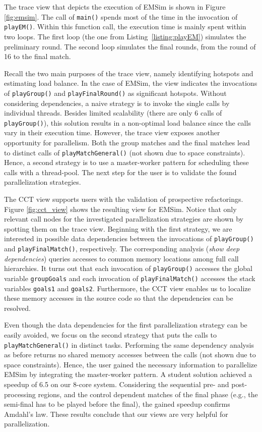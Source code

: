 The trace view that depicts the execution of EMSim is shown in Figure
\ref{fig:emsim}. The call of \texttt{main()} spends most of the time in the
invocation of \texttt{playEM()}. Within this function call, the execution time
is mainly spent within two loops. The first loop (the one from
Listing~\ref{listing:playEM}) simulates the preliminary round. The second loop
simulates the final rounds, from the round of 16 to the final match.

Recall the two main purposes of the trace view, namely identifying hotspots
and estimating load balance. In the case of EMSim, the view indicates the
invocations of \texttt{playGroup()} and \texttt{playFinalRound()} as
significant hotspots. Without considering dependencies, a naive strategy is to
invoke the single calls by individual threads. Besides limited scalability
(there are only 6 calls of \texttt{playGroup()}), this solution results in a
non-optimal load balance since the calls vary in their execution time. However,
the trace view exposes another opportunity for parallelism. Both the group
matches and the final matches lead to distinct calls of
\texttt{playMatchGeneral()} (not shown due to space constraints). Hence, a
second strategy is to use a master-worker pattern for scheduling these calls
with a thread-pool. The next step for the user is to validate the found
parallelization strategies.

The CCT view supports users with the validation of prospective refactorings. 
Figure \ref{fig:cct_view} shows the resulting view for EMSim. Notice that
only relevant call nodes for the investigated parallelization strategies are
shown by spotting them on the trace view. Beginning with the first strategy, we
are interested in possible data dependencies between the invocations of
\texttt{playGroup()} and \texttt{playFinalMatch()}, respectively. The
corresponding analysis (\textit{show deep dependencies}) queries accesses 
to common memory locations among full call hierarchies. It turns out that each
invocation of \texttt{playGroup()} accesses the global variable
\texttt{groupGoals} and each invocation of \texttt{playFinalMatch()} accesses
the stack variables \texttt{goals1} and \texttt{goals2}. Furthermore, the CCT
view enables us to localize these memory accesses in the source code so that
the dependencies can be resolved.

Even though the data dependencies for the first parallelization strategy
can be easily avoided, we focus on the second strategy that puts the calls to
\texttt{playMatchGeneral()} in distinct tasks. Performing the same dependency
analysis as before returns no shared memory accesses between the calls (not
shown due to space constraints). Hence, the user gained the necessary
information to parallelize EMSim by integrating the master-worker pattern. A
student solution achieved a speedup of 6.5 on our 8-core system. Considering
the sequential pre- and post-processing regions, and the control dependent
matches of the final phase (e.g., the semi-final has to be played before the
final), the gained speedup confirms Amdahl's law. These results conclude that
our views are very helpful for parallelization.
